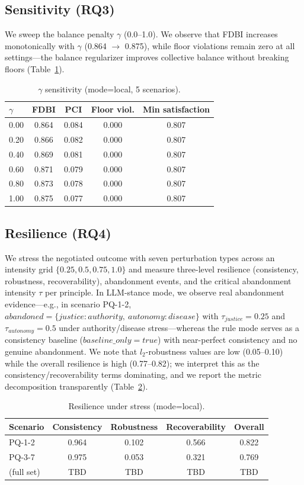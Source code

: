 \documentclass[11pt]{article}
\begin{document}
\subsection{Sensitivity (RQ3)}
\label{sec:rq3}
We sweep the balance penalty $\gamma$ (0.0--1.0). We observe that FDBI
increases monotonically with $\gamma$ (0.864 $\to$ 0.875), while floor
violations remain zero at all settings---the balance regularizer improves
collective balance without breaking floors (Table~\ref{tab:gamma}).
\begin{table}[t]
  \centering
  \caption{$\gamma$ sensitivity (mode=local, 5 scenarios).}
  \label{tab:gamma}
  \begin{tabular}{lcccc}
    \toprule
    $\gamma$ & FDBI & PCI & Floor viol. & Min satisfaction \\
    \midrule
    0.00 & 0.864 & 0.084 & 0.000 & 0.807 \\
    0.20 & 0.866 & 0.082 & 0.000 & 0.807 \\
    0.40 & 0.869 & 0.081 & 0.000 & 0.807 \\
    0.60 & 0.871 & 0.079 & 0.000 & 0.807 \\
    0.80 & 0.873 & 0.078 & 0.000 & 0.807 \\
    1.00 & 0.875 & 0.077 & 0.000 & 0.807 \\
    \bottomrule
  \end{tabular}
\end{table}

\subsection{Resilience (RQ4)}
\label{sec:rq4}
We stress the negotiated outcome with seven perturbation types across an
intensity grid $\{0.25,0.5,0.75,1.0\}$ and measure three-level resilience
(consistency, robustness, recoverability), abandonment events, and the
critical abandonment intensity $\tau$ per principle. In LLM-stance mode, we
observe real abandonment evidence---e.g., in scenario PQ-1-2,
$abandoned=\{justice: authority,\ autonomy: disease\}$ with
$\tau_{justice}=0.25$ and $\tau_{autonomy}=0.5$ under authority/disease
stress---whereas the rule mode serves as a consistency baseline
($baseline\_only=true$) with near-perfect consistency and no genuine
abandonment. We note that $l_2$-robustness values are low (0.05--0.10) while
the overall resilience is high (0.77--0.82); we interpret this as the
consistency/recoverability terms dominating, and we report the metric
decomposition transparently (Table~\ref{tab:resilience}).
\begin{table}[t]
  \centering
  \caption{Resilience under stress (mode=local).}
  \label{tab:resilience}
  \begin{tabular}{lcccc}
    \toprule
    Scenario & Consistency & Robustness & Recoverability & Overall \\
    \midrule
    PQ-1-2 & 0.964 & 0.102 & 0.566 & 0.822 \\
    PQ-3-7 & 0.975 & 0.053 & 0.321 & 0.769 \\
    (full set) & TBD & TBD & TBD & TBD \\
    \bottomrule
  \end{tabular}
\end{table}
\end{document}

